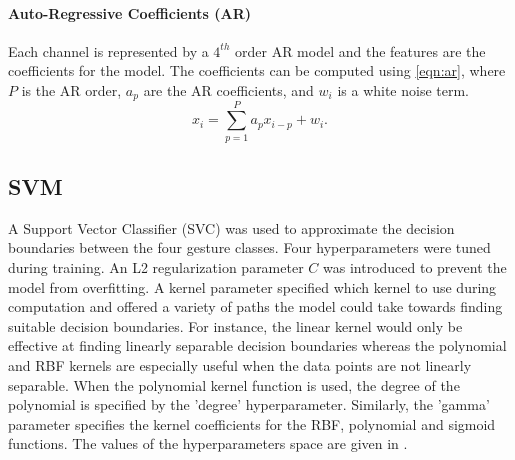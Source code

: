 \documentclass[journal]{IEEEtran}
\begin{document}
	\paragraph{Auto-Regressive Coefficients (AR)}
	Each channel is represented by a $4^{th}$ order AR model and the features are the coefficients for the model. The coefficients can be computed using \cref{eqn:ar}, where $P$ is the AR order, $a_p$ are the AR coefficients, and $w_i$ is a white noise term.
	\begin{equation}
	x_i = \sum_{p=1}^{P}a_px_{i-p}+w_i.
	\label{eqn:ar}
	\end{equation}
	
	\subsection{SVM}
	A Support Vector Classifier (SVC) was used to approximate the decision boundaries between the four gesture classes. Four hyperparameters were tuned during training. An L2 regularization parameter $C$ was introduced to prevent the model from overfitting. A kernel parameter specified which kernel to use during computation and offered a variety of paths the model could take towards finding suitable decision boundaries. For instance, the linear kernel would only be effective at finding linearly separable decision boundaries whereas the polynomial and RBF kernels are especially useful when the data points are not linearly separable. When the polynomial kernel function is used, the degree of the polynomial is specified by the 'degree' hyperparameter. Similarly, the 'gamma' parameter specifies the kernel coefficients for the RBF, polynomial and sigmoid functions. The values of the hyperparameters space are given in .
	
	\begingroup
	\def\arraystretch{1.2}%
	\setlength{\tabcolsep}{2pt} %
	\begin{table}[b]
		\centering
		\caption{SVM Hyperparameter Tuning Space.}
		\label{table:svm_param}
	\end{table}%
	\endgroup
	
\end{document}
